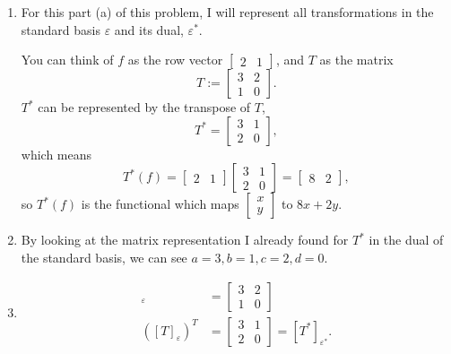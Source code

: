 \documentclass{article}
\begin{document}
\bigskip
\par
\begin{prob}
\end{prob}
\begin{enumerate}[label=(\alph*)]
    \item For this part (a) of this problem, I will represent all transformations in the standard basis $\varepsilon$ and its dual, $\varepsilon^*$.
        \par
        You can think of $f$ as the row vector $ \begin{bmatrix}
            2 & 1
    \end{bmatrix}$, and $T$ as the matrix
    \[ T := \begin{bmatrix}
        3 & 2 \\
        1 & 0
    \end{bmatrix}. \]
    $T^*$ can be represented by the transpose of $T$,
    \[ T^* = \begin{bmatrix}
        3 & 1 \\
        2 & 0
    \end{bmatrix}, \]
    which means
    \[ T^*(f) = \begin{bmatrix}
        2 & 1
    \end{bmatrix} \begin{bmatrix}
        3 & 1 \\
        2 & 0
    \end{bmatrix} = \begin{bmatrix}
        8 & 2
    \end{bmatrix}, \]
    so $T^*(f)$ is the functional which maps $ \begin{bmatrix}
        x \\
        y
    \end{bmatrix}$ to $8x+2y$.
\item By looking at the matrix representation I already found for $T^*$ in the dual of the standard basis, we can see $a=3, b=1, c=2, d=0$.
\item \begin{align*}
        [T]_\varepsilon &= \begin{bmatrix}
            3 & 2 \\
            1 & 0
        \end{bmatrix} \\
            ([T]_\varepsilon)^T &= \begin{bmatrix}
            3 & 1 \\
            2 & 0
        \end{bmatrix} = [T^*]_{\varepsilon^*}.
\end{align*}
\end{enumerate}
\end{document}
